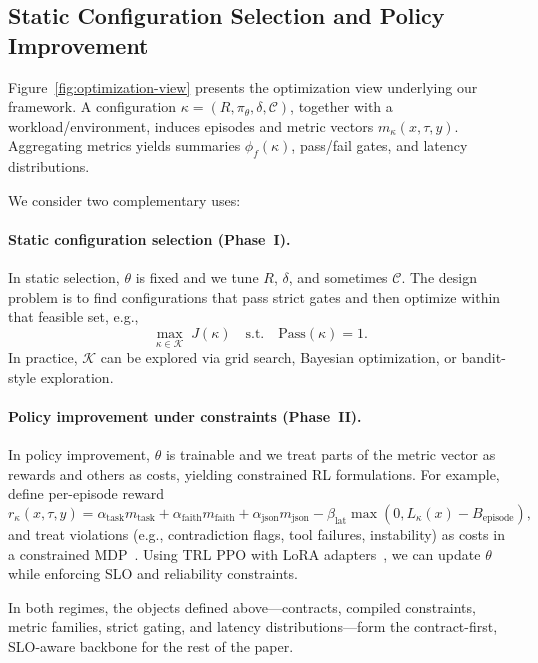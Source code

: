 \documentclass[11pt]{article}
\begin{document}
\subsection{Static Configuration Selection and Policy Improvement}
\label{sec:problem-optimization}

Figure~\ref{fig:optimization-view} presents the optimization view underlying our framework.
A configuration $\kappa=(R,\pi_\theta,\delta,\mathcal{C})$, together with a workload/environment, induces episodes and metric vectors $m_\kappa(x,\tau,y)$.
Aggregating metrics yields summaries $\phi_f(\kappa)$, pass/fail gates, and latency distributions.

We consider two complementary uses:

\paragraph{Static configuration selection (Phase~I).}
In static selection, $\theta$ is fixed and we tune $R$, $\delta$, and sometimes $\mathcal{C}$.
The design problem is to find configurations that pass strict gates and then optimize within that feasible set, e.g.,
\[
\max_{\kappa\in\mathcal{K}} \; J(\kappa)
\quad\text{s.t.}\quad \mathrm{Pass}(\kappa)=1.
\]
In practice, $\mathcal{K}$ can be explored via grid search, Bayesian optimization, or bandit-style exploration.

\paragraph{Policy improvement under constraints (Phase~II).}
In policy improvement, $\theta$ is trainable and we treat parts of the metric vector as rewards and others as costs, yielding constrained RL formulations.
For example, define per-episode reward
\[
r_\kappa(x,\tau,y)=
\alpha_{\text{task}} m_{\text{task}}+
\alpha_{\text{faith}} m_{\text{faith}}+
\alpha_{\text{json}} m_{\text{json}}
-\beta_{\text{lat}}\max(0, L_\kappa(x)-B_{\text{episode}}),
\]
and treat violations (e.g., contradiction flags, tool failures, instability) as costs in a constrained MDP~\citep{altman1999cmdp,achiam2017cpo}.
Using TRL PPO with LoRA adapters~\citep{schulman2017ppo,dettmers2023qlora}, we can update $\theta$ while enforcing SLO and reliability constraints.

In both regimes, the objects defined above---contracts, compiled constraints, metric families, strict gating, and latency distributions---form the contract-first, SLO-aware backbone for the rest of the paper.
\end{document}
